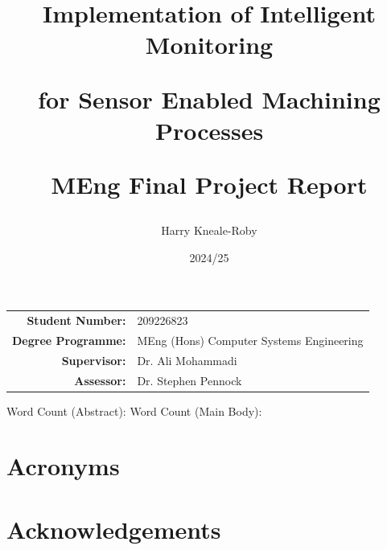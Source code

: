 \documentclass{article}
\title{   
    Implementation of Intelligent Monitoring
    
    for Sensor Enabled Machining Processes

    \vspace{10px}
    MEng Final Project Report    
}
\author{Harry Kneale-Roby}
\date{2024/25}
\providecommand{\main}{LaTeX/final_report}  %
\def\biblio{}  %
\begin{document}
\def\biblio{}

\maketitle

\begin{table}[!ht]
    \centering
    \begin{tabular}{rl}
        \textbf{Student Number:} & 209226823 \\
        \textbf{Degree Programme:} & MEng (Hons) Computer Systems Engineering\\
        \textbf{Supervisor:} & Dr. Ali Mohammadi\\
        \textbf{Assessor:} & Dr. Stephen Pennock 
    \end{tabular}
\end{table}

\begin{center}
    Word Count (Abstract): \linebreak
    Word Count (Main Body): 
\end{center}


\addtocounter{page}{-1}
\thispagestyle{empty} 
\pagebreak


\tableofcontents

\pagebreak

\section{Acronyms}

\pagebreak













\section{Acknowledgements}

\onecolumn



\end{document}
